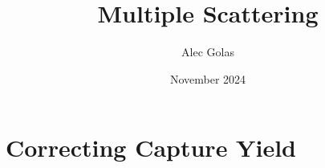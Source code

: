 \documentclass{article}
\title{Multiple Scattering}
\author{Alec Golas}
\date{November 2024}
\begin{document}
\maketitle


\section{Correcting Capture Yield}
\label{sec:capture-yield-correction}

\end{document}
